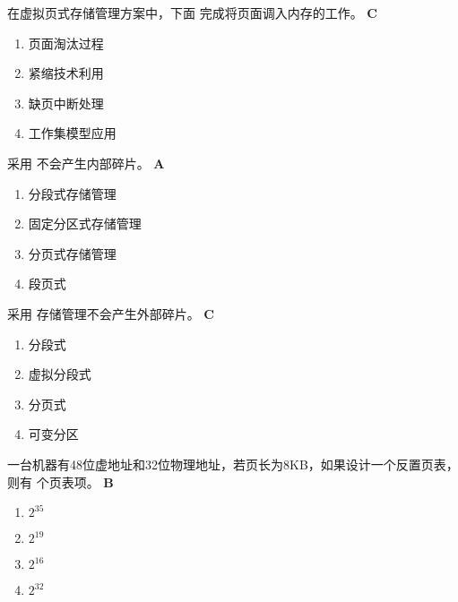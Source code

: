 \begin{problem}
	在虚拟页式存储管理方案中，下面 \myline 完成将页面调入内存的工作。
	\textbf{C}
	\vspace{-0.5em}
	\begin{multicols}{4}
		\begin{enumerate}[label=\Alph*.]
			\item 页面淘汰过程
			\item 紧缩技术利用
			\item 缺页中断处理
			\item 工作集模型应用
		\end{enumerate}
	\end{multicols}
	\vspace{-1em}
\end{problem}


\begin{problem}
	采用 \myline 不会产生内部碎片。
	\textbf{A}
	\vspace{-0.5em}
	\begin{multicols}{2}
		\begin{enumerate}[label=\Alph*.]
			\item 分段式存储管理
			\item 固定分区式存储管理
			\item 分页式存储管理
			\item 段页式
		\end{enumerate}
	\end{multicols}
	\vspace{-1em}
\end{problem}



\begin{problem}
	​采用 \myline 存储管理不会产生外部碎片。
	\textbf{C}
	\vspace{-0.5em}
	\begin{multicols}{4}
		\begin{enumerate}[label=\Alph*.]
			\item 分段式
			\item 虚拟分段式
			\item 分页式
			\item 可变分区
		\end{enumerate}
	\end{multicols}
	\vspace{-1em}
\end{problem}


\begin{problem}
	一台机器有48位虚地址和32位物理地址，若页长为8KB，如果设计一个反置页表，则有 \myline 个页表项。
	\textbf{B}
	\vspace{-0.5em}
	\begin{multicols}{4}
		\begin{enumerate}[label=\Alph*.]
			\item $2^{35}$
			\item $2^{19}$
			\item $2^{16}$
			\item $2^{32}$
		\end{enumerate}
	\end{multicols}
	\vspace{-1em}
\end{problem}


